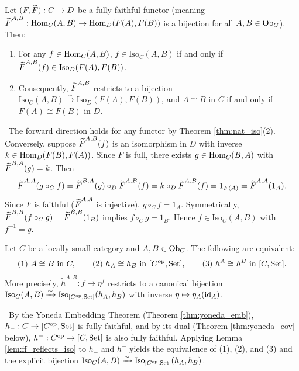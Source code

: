 \documentclass[10pt,a4paper]{article}
\begin{document}
\begin{lemma}\label{lem:ff_reflects_iso}
Let $(F, {\widetilde{F}\textrm{}}) : C \to D$ be a fully faithful functor (meaning ${\widetilde{F}\textrm{}}^{A,B} : {\textrm{Hom}}_C(A,B) \to {\textrm{Hom}}_D(F(A), F(B))$ is a bijection for all $A, B \in {\textrm{Ob}}_C$). Then:
\begin{enumerate}
\item For any $f \in {\textrm{Hom}}_C(A,B)$, $f \in \mathrm{Iso}_C(A,B)$ if and only if ${\widetilde{F}\textrm{}}^{A,B}(f) \in \mathrm{Iso}_D(F(A), F(B))$.
\item Consequently, ${\widetilde{F}\textrm{}}^{A,B}$ restricts to a bijection $\mathrm{Iso}_C(A,B) \xrightarrow{\sim} \mathrm{Iso}_D(F(A), F(B))$, and $A \cong B$ in $C$ if and only if $F(A) \cong F(B)$ in $D$.
\end{enumerate}
\end{lemma}
\myprf\ The forward direction holds for any functor by Theorem \ref{thm:nat_iso}(2). Conversely, suppose ${\widetilde{F}\textrm{}}^{A,B}(f)$ is an isomorphism in $D$ with inverse $k \in {\textrm{Hom}}_D(F(B), F(A))$. Since $F$ is full, there exists $g \in {\textrm{Hom}}_C(B,A)$ with ${\widetilde{F}\textrm{}}^{B,A}(g) = k$. Then
$${\widetilde{F}\textrm{}}^{A,A}(g \circ_C f) = {\widetilde{F}\textrm{}}^{B,A}(g) \circ_D {\widetilde{F}\textrm{}}^{A,B}(f) = k \circ_D {\widetilde{F}\textrm{}}^{A,B}(f) = 1_{F(A)} = {\widetilde{F}\textrm{}}^{A,A}(1_A).$$
Since $F$ is faithful (${\widetilde{F}\textrm{}}^{A,A}$ is injective), $g \circ_C f = 1_A$. Symmetrically, ${\widetilde{F}\textrm{}}^{B,B}(f \circ_C g) = {\widetilde{F}\textrm{}}^{B,B}(1_B)$ implies $f \circ_C g = 1_B$. Hence $f \in \mathrm{Iso}_C(A,B)$ with $f^{-1} = g$. \myqed

\begin{theorem}\label{thm:yoneda_iso}
Let $C$ be a locally small category and $A, B \in {\textrm{Ob}}_C$. The following are equivalent:
$$\text{(1) } A \cong B \text{ in } C, \qquad \text{(2) } h_A \cong h_B \text{ in } [C^{\textrm{op}}, {\textrm{Set}}], \qquad \text{(3) } h^A \cong h^B \text{ in } [C, {\textrm{Set}}].$$
More precisely, $\widetilde{h}^{A,B} : f \mapsto \eta^f$ restricts to a canonical bijection $\mathrm{Iso}_C(A, B) \xrightarrow{\sim} \mathrm{Iso}_{[C^{\textrm{op}}, {\textrm{Set}}]}(h_A, h_B)$ with inverse $\eta \mapsto \eta_A({\textrm{id}}_A)$.
\end{theorem}
\myprf\ By the Yoneda Embedding Theorem (Theorem \ref{thm:yoneda_emb}), $h_- : C \to [C^{\textrm{op}}, {\textrm{Set}}]$ is fully faithful, and by its dual (Theorem \ref{thm:yoneda_cov} below), $h^- : C^{\textrm{op}} \to [C, {\textrm{Set}}]$ is also fully faithful. Applying Lemma \ref{lem:ff_reflects_iso} to $h_-$ and $h^-$ yields the equivalence of (1), (2), and (3) and the explicit bijection $\mathrm{Iso}_C(A, B) \xrightarrow{\sim} \mathrm{Iso}_{[C^{\textrm{op}}, {\textrm{Set}}]}(h_A, h_B)$. \myqed
\end{document}
